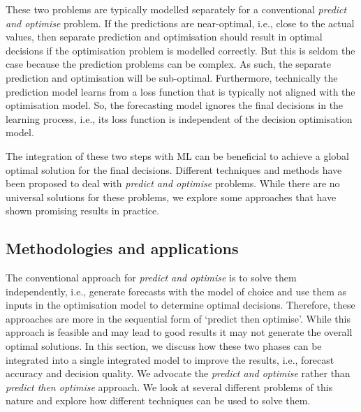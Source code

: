 \documentclass[graybox]{svmult}
\begin{document}
These two problems are typically modelled separately for a conventional \textit{predict and optimise} problem. If the predictions are near-optimal, i.e., close to the actual values, then separate prediction and optimisation should result in optimal decisions if the optimisation problem is modelled correctly. But this is seldom the case because the prediction problems can be complex. As such, the separate prediction and optimisation will be sub-optimal. Furthermore, technically the prediction model learns from a loss function that is typically not aligned with the optimisation model. So, the forecasting model ignores the final decisions in the learning process, i.e., its loss function is independent of the decision optimisation model. 

The integration of these two steps with ML can be beneficial to achieve a global optimal solution for the final decisions. Different techniques and methods have been proposed to deal with \textit{predict and optimise} problems. While there are no universal solutions for these problems, we explore some approaches that have shown promising results in practice.  

 


\subsection{Methodologies and applications}\label{method1}

The conventional approach for \textit{predict and optimise} is to solve them independently, i.e., generate forecasts with the model of choice and use them as inputs in the optimisation model to determine optimal decisions. Therefore, these approaches are more in the sequential form of `predict then optimise'. While this approach is feasible and may lead to good results it may not generate the overall optimal solutions. In this section, we discuss how these two phases can be integrated into a single integrated model to improve the results, i.e., forecast accuracy and decision quality. We advocate the \textit{predict and optimise} rather than \textit{predict then optimise} approach. We look at several different problems of this nature and explore how different techniques can be used to solve them. 
\end{document}
